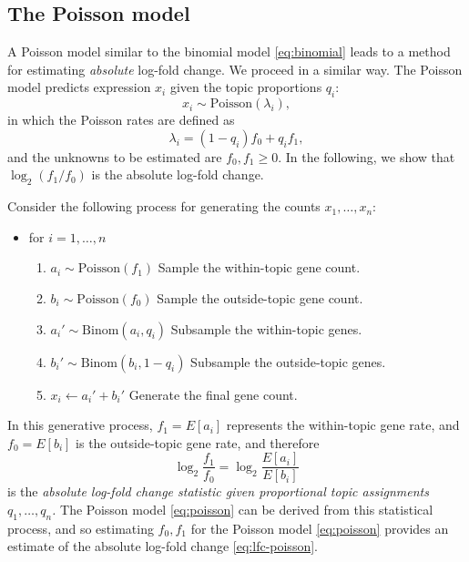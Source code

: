 \documentclass[final]{siamart171218}
\begin{document}
\subsection{The Poisson model}

A Poisson model similar to the binomial model \eqref{eq:binomial}
leads to a method for estimating {\em absolute} log-fold change. We
proceed in a similar way. The Poisson model predicts expression $x_i$
given the topic proportions $q_i$:
\begin{equation}
x_i \sim \mathrm{Poisson}(\lambda_i),
\label{eq:poisson}
\end{equation}
in which the Poisson rates are defined as
\begin{equation}
\lambda_i = (1 - q_i) f_0 + q_i f_1,
\end{equation}
and the unknowns to be estimated are $f_0, f_1 \geq 0$.  In the
following, we show that $\log_2(f_1/f_0)$ is the absolute log-fold
change.

Consider the following process for generating the counts $x_1, \ldots,
x_n$:
\begin{itemize}

\item for $i = 1, \ldots, n$
\begin{enumerate}

\item $a_i \sim \mathrm{Poisson}(f_1)$ 
\hfill Sample the within-topic gene count. \hspace{2em}

\item $b_i \sim \mathrm{Poisson}(f_0)$ 
\hfill Sample the outside-topic gene count. \hspace{2em}

\item $a_i' \sim \mathrm{Binom}(a_i, q_i)$ 
\hfill Subsample the within-topic genes. \hspace{2em}

\item $b_i' \sim \mathrm{Binom}(b_i, 1-q_i)$ 
\hfill Subsample the outside-topic genes. \hspace{2em}

\item $x_i \leftarrow a_i' + b_i'$ 
\hfill Generate the final gene count. \hspace{2em}

\end{enumerate}
\end{itemize}
In this generative process, $f_1 = E[a_i]$ represents the
within-topic gene rate, and $f_0 = E[b_i]$ is the outside-topic gene
rate, and therefore 
\begin{equation}
\log_2 \frac{f_1}{f_0} = \log_2 \frac{E[a_i]}{E[b_i]}
\label{eq:lfc-poisson}
\end{equation}
is the {\em absolute log-fold change statistic given proportional
  topic assignments $q_1, \ldots, q_n$.} The Poisson model
\eqref{eq:poisson} can be derived from this statistical process, and
so estimating $f_0, f_1$ for the Poisson model \eqref{eq:poisson}
provides an estimate of the absolute log-fold change
\eqref{eq:lfc-poisson}.
\end{document}
